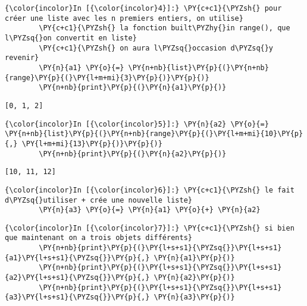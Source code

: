     \begin{Verbatim}[commandchars=\\\{\},frame=single,framerule=0.3mm,rulecolor=\color{cellframecolor}]
{\color{incolor}In [{\color{incolor}4}]:} \PY{c+c1}{\PYZsh{} pour créer une liste avec les n premiers entiers, on utilise}
        \PY{c+c1}{\PYZsh{} la fonction built\PYZhy{}in range(), que l\PYZsq{}on convertit en liste}
        \PY{c+c1}{\PYZsh{} on aura l\PYZsq{}occasion d\PYZsq{}y revenir}
        \PY{n}{a1} \PY{o}{=} \PY{n+nb}{list}\PY{p}{(}\PY{n+nb}{range}\PY{p}{(}\PY{l+m+mi}{3}\PY{p}{)}\PY{p}{)}
        \PY{n+nb}{print}\PY{p}{(}\PY{n}{a1}\PY{p}{)}
\end{Verbatim}


    \begin{Verbatim}[commandchars=\\\{\},frame=single,framerule=0.3mm,rulecolor=\color{cellframecolor}]
[0, 1, 2]
\end{Verbatim}

    \begin{Verbatim}[commandchars=\\\{\},frame=single,framerule=0.3mm,rulecolor=\color{cellframecolor}]
{\color{incolor}In [{\color{incolor}5}]:} \PY{n}{a2} \PY{o}{=} \PY{n+nb}{list}\PY{p}{(}\PY{n+nb}{range}\PY{p}{(}\PY{l+m+mi}{10}\PY{p}{,} \PY{l+m+mi}{13}\PY{p}{)}\PY{p}{)}
        \PY{n+nb}{print}\PY{p}{(}\PY{n}{a2}\PY{p}{)}
\end{Verbatim}


    \begin{Verbatim}[commandchars=\\\{\},frame=single,framerule=0.3mm,rulecolor=\color{cellframecolor}]
[10, 11, 12]
\end{Verbatim}

    \begin{Verbatim}[commandchars=\\\{\},frame=single,framerule=0.3mm,rulecolor=\color{cellframecolor}]
{\color{incolor}In [{\color{incolor}6}]:} \PY{c+c1}{\PYZsh{} le fait d\PYZsq{}utiliser + crée une nouvelle liste}
        \PY{n}{a3} \PY{o}{=} \PY{n}{a1} \PY{o}{+} \PY{n}{a2}
\end{Verbatim}


    \begin{Verbatim}[commandchars=\\\{\},frame=single,framerule=0.3mm,rulecolor=\color{cellframecolor}]
{\color{incolor}In [{\color{incolor}7}]:} \PY{c+c1}{\PYZsh{} si bien que maintenant on a trois objets différents}
        \PY{n+nb}{print}\PY{p}{(}\PY{l+s+s1}{\PYZsq{}}\PY{l+s+s1}{a1}\PY{l+s+s1}{\PYZsq{}}\PY{p}{,} \PY{n}{a1}\PY{p}{)}
        \PY{n+nb}{print}\PY{p}{(}\PY{l+s+s1}{\PYZsq{}}\PY{l+s+s1}{a2}\PY{l+s+s1}{\PYZsq{}}\PY{p}{,} \PY{n}{a2}\PY{p}{)}
        \PY{n+nb}{print}\PY{p}{(}\PY{l+s+s1}{\PYZsq{}}\PY{l+s+s1}{a3}\PY{l+s+s1}{\PYZsq{}}\PY{p}{,} \PY{n}{a3}\PY{p}{)}
\end{Verbatim}


